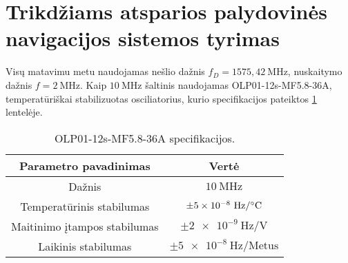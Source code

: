 \documentclass[../gnss_interference_resistant_thesis.tex]{subfiles}
\begin{document}
\section{Trikdžiams atsparios palydovinės navigacijos sistemos tyrimas}

Visų matavimu metu naudojamas nešlio dažnis
$f_D = 1575,42\ \mathrm{MHz}$, nuskaitymo dažnis $f = 2\ \mathrm{MHz}$.
Kaip $10\ \mathrm{MHz}$ šaltinis
naudojamas OLP01-12s-MF5.8-36A, temperatūriškai stabilizuotas osciliatorius,
kurio specifikacijos pateiktos \ref{tab:clock_source_spec} lentelėje.


\begin{table}[h]
    \protect\caption{\label{tab:clock_source_spec}OLP01-12s-MF5.8-36A specifikacijos.}
    \centering{}%
    \begin{tabular}{| c | c |}
    \hline
    Parametro pavadinimas & Vertė \\
    \hline
    Dažnis                         & $10\ \mathrm{MHz}$ \\
    Temperatūrinis stabilumas      & $\pm \num{5e-8}\ \mathrm{Hz/\degree C}$ \\
    Maitinimo įtampos stabilumas   & $\pm \num{2e-9}\ \mathrm{Hz/V}$ \\
    Laikinis stabilumas             & $\pm \num{5e-8}\ \mathrm{Hz/Metus}$ \\
    \hline
    \end{tabular}
\end{table}







\end{document}
